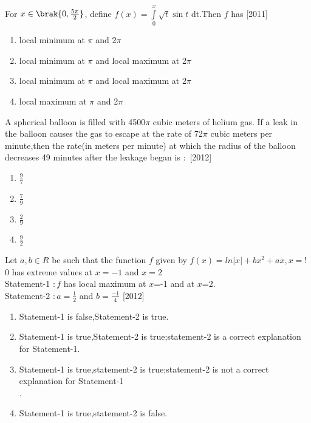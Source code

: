 \iffalse
  \title{APPLICATION OF DERIVATIVES}
  \author{YERRA AKHILESH}
  \section{mcq-single}
 \fi
 \item[25.] For $x \in \brak{0,\frac{5\pi}{2}}$, define $f(x)=\int\limits_0^x\sqrt{t}\sin t$ dt.Then $f$ has \hfill{[2011]}\\
\begin{enumerate}
    \item   local minimum at $\pi$ and 2$\pi$\\
    \item   local minimum at $\pi$ and local maximum at 2$\pi$
    \item   local minimum at $\pi$ and local maximum at 2$\pi$
    \item   local maximum at $\pi$ and 2$\pi$\\
\end{enumerate}
    
\item[26.] A spherical balloon is filled with 4500$\pi$ cubic meters of helium gas. If a leak in the balloon causes the gas to escape at the rate of 72$\pi$ cubic meters per minute,then the rate{(in meters per minute)} at which the radius of the balloon decreases 49 minutes after the leakage began is $:$ \hfill{[2012]}\\
\begin{enumerate}
    \item   $\frac{9}{7}$\\
    \item   $\frac{7}{9}$\\
    \item   $\frac{2}{9}$\\
    \item   $\frac{9}{2}$ \\
\end{enumerate} 

\item[27.] Let $a,b\in R$ be such that the function $f$ given by $f(x)=ln|x|+bx^{2}+ax,x=$!$0$ has extreme values at $x=-1$ and $x=2$\\
Statement-1 $: f$ has local maximum at $x$=-1 and at $x$=2.\\
Statement-2 $: a=\frac{1}{2}$ and $b=\frac{-1}{4}$ \hfill{[2012]}\\
\begin{enumerate}
    \item Statement-1 is false,Statement-2 is true.\\
    \item Statement-1 is true,Statement-2 is true;statement-2 is a correct explanation for Statement-1.\\
    \item Statement-1 is true,statement-2 is true;statement-2 is not a correct explanation for Statement-1\\.
    \item Statement-1 is true,statement-2 is false.\\
\end{enumerate}

